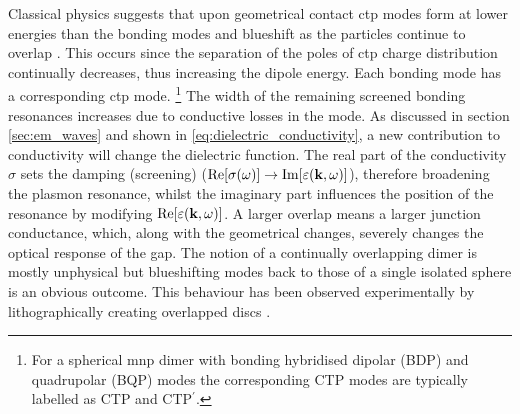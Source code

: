 \documentclass{article}
\begin{document}
Classical physics suggests that upon geometrical contact \gls{ctp} modes form at lower energies than the bonding modes and blueshift as the particles continue to overlap \cite{romero2006}. This occurs since the separation of the poles of \gls{ctp} charge distribution continually decreases, thus increasing the dipole energy. Each bonding mode has a corresponding \gls{ctp} mode.%
\footnote{For a spherical \gls{mnp} dimer with bonding hybridised dipolar (BDP) and quadrupolar (BQP) modes the corresponding CTP modes are typically labelled as CTP and CTP$^\prime$.}
The width of the remaining screened bonding resonances increases due to conductive losses in the mode. As discussed in section \ref{sec:em_waves} and shown in \eqref{eq:dielectric_conductivity}, a new contribution to conductivity will change the dielectric function. The real part of the conductivity $\sigma$ sets the damping {\color{red}(screening)} ($\mathrm{Re}\!\left[{\sigma(\omega)}\right]\rightarrow\mathrm{Im}\!\left[{\varepsilon(\mathbf{k}, \omega)}\right]$),  therefore broadening the plasmon resonance, whilst the imaginary part influences the position of the resonance by modifying $\mathrm{Re}\!\left[{\varepsilon(\mathbf{k}, \omega)}\right]$. A larger overlap means a larger junction conductance, which, along with the geometrical changes, severely changes the optical response of the gap.
The notion of a continually overlapping dimer is mostly unphysical but blueshifting modes back to those of a single isolated sphere is an obvious outcome. This behaviour has been observed experimentally by lithographically creating overlapped discs \cite{lassiter2008}.
\end{document}
